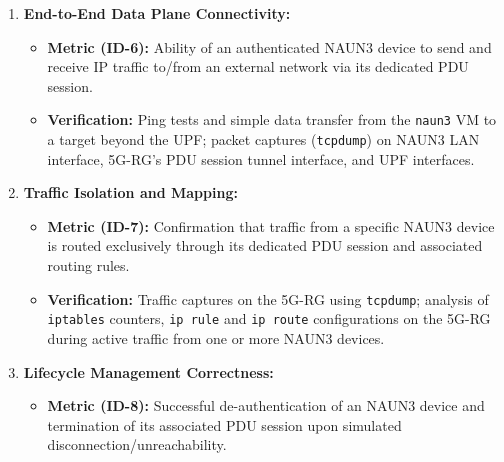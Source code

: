 \begin{enumerate}
{\begin{enumerate}
{\begin{itemize}
                    \item \textbf{Metric (\ac{5GC}) (ID-5):} Successful assignment of a \ac{5GC} \ac{IP} address by the \ac{5GC} (\ac{SMF}/\ac{UPF}) to the dedicated \ac{PDU} session for the \ac{NAUN3} device.

                    \item \textbf{Verification:} \texttt{ip addr} command output on the \texttt{naun3} \ac{VM}; \texttt{dnsmasq} logs on the \ac{5G-RG}; \texttt{nr-cli ps-list} output on the \ac{5G-RG}; Open5GS \ac{SMF}/\ac{UPF} logs. 
                \end{itemize}
            }
            \item {
                \textbf{End-to-End Data Plane Connectivity:}
                \begin{itemize}
                    \item \textbf{Metric (ID-6):} Ability of an authenticated \ac{NAUN3} device to send and receive \ac{IP} traffic to/from an external network via its dedicated \ac{PDU} session. 

                    \item \textbf{Verification:} Ping tests and simple data transfer from the \texttt{naun3} \ac{VM} to a target beyond the \ac{UPF}; packet captures (\texttt{tcpdump}) on \ac{NAUN3} \ac{LAN} interface, \ac{5G-RG}'s \ac{PDU} session tunnel interface, and \ac{UPF} interfaces.
                \end{itemize}
            }
            \item {
                \textbf{Traffic Isolation and Mapping:}
                \begin{itemize}
                    \item \textbf{Metric (ID-7):} Confirmation that traffic from a specific \ac{NAUN3} device is routed exclusively through its dedicated \ac{PDU} session and associated routing rules. 

                    \item \textbf{Verification:} Traffic captures on the \ac{5G-RG} using \texttt{tcpdump}; analysis of \texttt{iptables} counters, \texttt{ip rule} and \texttt{ip route} configurations on the \ac{5G-RG} during active traffic from one or more \ac{NAUN3} devices. 
                \end{itemize}
            }
            \item {
                \textbf{Lifecycle Management Correctness:}
                \begin{itemize}
                    \item \textbf{Metric (ID-8):} Successful de-authentication of an \ac{NAUN3} device and termination of its associated \ac{PDU} session upon simulated disconnection/unreachability.


\end{itemize}}
\end{enumerate}}
\end{enumerate}
